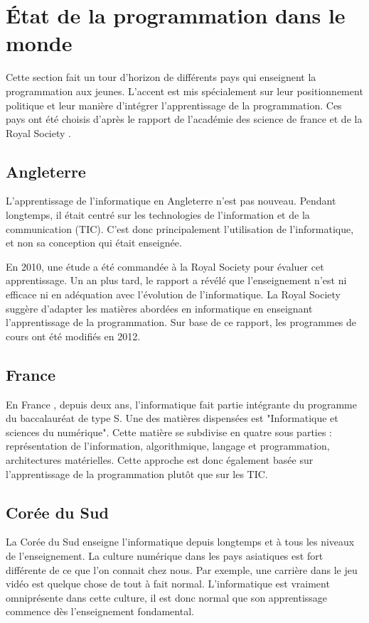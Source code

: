 \section{État de la programmation dans le monde}
\label{monde}
Cette section fait un tour d'horizon de différents pays qui enseignent la programmation aux jeunes. L'accent est mis spécialement sur leur positionnement politique et leur manière d'intégrer l'apprentissage de la programmation. Ces pays ont été choisis d'après le rapport de l'académie des science de france \cite{ens-info-fr} et de la Royal Society \cite{comput-school}.

\subsection{Angleterre}
L'apprentissage de l'informatique en Angleterre \cite{status-guid} n'est pas nouveau. Pendant longtemps, il était centré sur les technologies de l'information et de la communication (TIC). C'est donc principalement l'utilisation de l'informatique, et non sa conception qui était enseignée.

En 2010, une étude a été commandée à la Royal Society pour évaluer cet apprentissage. Un an plus tard, le rapport a révélé que l'enseignement n'est ni efficace ni en adéquation avec l'évolution de l'informatique. La Royal Society suggère d'adapter les matières abordées en informatique en enseignant l'apprentissage de la programmation. Sur base de ce rapport, les programmes de cours ont été modifiés en 2012.

\subsection{France}
En France \cite{wiki-info-et-sc-du-num} \cite{wiki-bac-sc}, depuis deux ans, l'informatique fait partie intégrante du programme du baccalauréat de type S. Une des matières dispensées est "Informatique et sciences du numérique". Cette matière se subdivise en quatre sous parties : représentation de l'information, algorithmique, langage et programmation, architectures matérielles. Cette approche est donc également basée sur l'apprentissage de la programmation plutôt que sur les TIC.

\subsection{Corée du Sud}
La Corée du Sud enseigne l'informatique depuis longtemps et à tous les niveaux de l'enseignement. La culture numérique dans les pays asiatiques est fort différente de ce que l'on connait chez nous. Par exemple, une carrière dans le jeu vidéo est quelque chose de tout à fait normal. L'informatique est vraiment omniprésente dans cette culture, il est donc normal que son apprentissage commence dès l'enseignement \gls{fondamental}.

